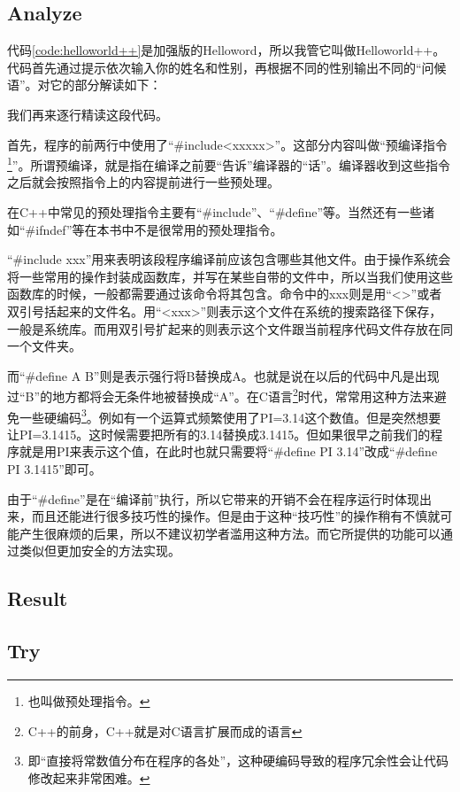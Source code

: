 \subsection{Analyze}
代码\ref{code:helloworld++}是加强版的Helloword，所以我管它叫做Helloworld++。代码首先通过提示依次输入你的姓名和性别，再根据不同的性别输出不同的“问候语”。对它的部分解读如下：
\begin{quote}
\showremarks
\end{quote}

我们再来逐行精读这段代码。

首先，程序的前两行中使用了“\#include<xxxxx>”。这部分内容叫做“预编译指令\footnote{也叫做预处理指令。}”。所谓预编译，就是指在编译之前要“告诉”编译器的“话”。编译器收到这些指令之后就会按照指令上的内容提前进行一些预处理。

在C++中常见的预处理指令主要有“\#include”、“\#define”等。当然还有一些诸如“\#ifndef”等在本书中不是很常用的预处理指令。

“\#include xxx”用来表明该段程序编译前应该包含哪些其他文件。由于操作系统会将一些常用的操作封装成函数库，并写在某些自带的文件中，所以当我们使用这些函数库的时候，一般都需要通过该命令将其包含。命令中的xxx则是用“<>”或者双引号括起来的文件名。用“<xxx>”则表示这个文件在系统的搜索路径下保存，一般是系统库。而用双引号扩起来的则表示这个文件跟当前程序代码文件存放在同一个文件夹。

而“\#define A B”则是表示强行将B替换成A。也就是说在以后的代码中凡是出现过“B”的地方都将会无条件地被替换成“A”。在C语言\footnote{C++的前身，C++就是对C语言扩展而成的语言}时代，常常用这种方法来避免一些硬编码\footnote{即“直接将常数值分布在程序的各处”，这种硬编码导致的程序冗余性会让代码修改起来非常困难。}。例如有一个运算式频繁使用了PI=3.14这个数值。但是突然想要让PI=3.1415。这时候需要把所有的3.14替换成3.1415。但如果很早之前我们的程序就是用PI来表示这个值，在此时也就只需要将“\#define PI 3.14”改成“\#define PI 3.1415”即可。

由于“\#define”是在“编译前”执行，所以它带来的开销不会在程序运行时体现出来，而且还能进行很多技巧性的操作。但是由于这种“技巧性”的操作稍有不慎就可能产生很麻烦的后果，所以不建议初学者滥用这种方法。而它所提供的功能可以通过类似但更加安全的方法实现。


\subsection{Result}

\subsection{Try}


